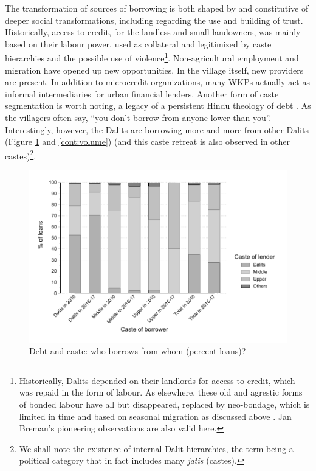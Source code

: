 \documentclass[a4paper, 11pt, onecolumn]{article}
\begin{document}
The transformation of sources of borrowing is both shaped by and constitutive of deeper social transformations, including regarding the use and building of trust.
Historically, access to credit, for the landless and small landowners, was mainly based on their labour power, used as collateral and legitimized by caste hierarchies and the possible use of violence\footnote{Historically, Dalits depended on their landlords for access to credit, which was repaid in the form of labour. As elsewhere, these old and agrestic forms of bonded labour have all but disappeared, replaced by neo-bondage, which is limited in time and based on seasonal migration as discussed above \citep{Breman1974}. Jan Breman's pioneering observations are also valid here.}. 
Non-agricultural employment and migration have opened up new opportunities. 
In the village itself, new providers are present. 
In addition to microcredit organizations, many WKPs actually act as informal intermediaries for urban financial lenders. 
Another form of caste segmentation is worth noting, a legacy of a persistent Hindu theology of debt \citep{Kane2012}. 
As the villagers often say, ``you don't borrow from anyone lower than you''. 
Interestingly, however, the Dalits are borrowing more and more from other Dalits (Figure \ref{cont:loans} and \ref{cont:volume}) (and this caste retreat is also observed in other castes)\footnote{We shall note the existence of internal Dalit hierarchies, the term being a political category that in fact includes many \textit{jatis} (castes).}.  

\begin{figure}[h!]
\center
\includegraphics[width=12cm]{contengency_borrower_loan_stata.pdf}
\caption{Debt and caste: who borrows from whom (percent loans)?}
\label{cont:loans}
\end{figure}
\end{document}
